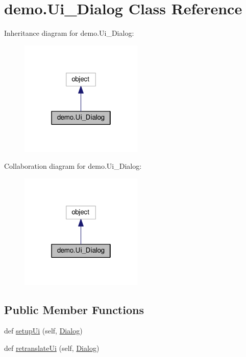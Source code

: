 \hypertarget{classdemo_1_1_ui___dialog}{}\section{demo.\+Ui\+\_\+\+Dialog Class Reference}
\label{classdemo_1_1_ui___dialog}


Inheritance diagram for demo.\+Ui\+\_\+\+Dialog\+:\nopagebreak
\begin{figure}[H]
\begin{center}
\leavevmode
\includegraphics[width=166pt]{classdemo_1_1_ui___dialog__inherit__graph}
\end{center}
\end{figure}


Collaboration diagram for demo.\+Ui\+\_\+\+Dialog\+:\nopagebreak
\begin{figure}[H]
\begin{center}
\leavevmode
\includegraphics[width=166pt]{classdemo_1_1_ui___dialog__coll__graph}
\end{center}
\end{figure}
\subsection*{Public Member Functions}
\begin{DoxyCompactItemize}
\item 
def \hyperlink{classdemo_1_1_ui___dialog_aa8d94de0a56d81a8c775cc8465920c2b}{setup\+Ui} (self, \hyperlink{namespacedemo_a8f7be6e690a527383cb1b696ba6bcb2e}{Dialog})
\item 
def \hyperlink{classdemo_1_1_ui___dialog_a386ae02a1154ecb35615474b97b4291c}{retranslate\+Ui} (self, \hyperlink{namespacedemo_a8f7be6e690a527383cb1b696ba6bcb2e}{Dialog})
\end{DoxyCompactItemize}
